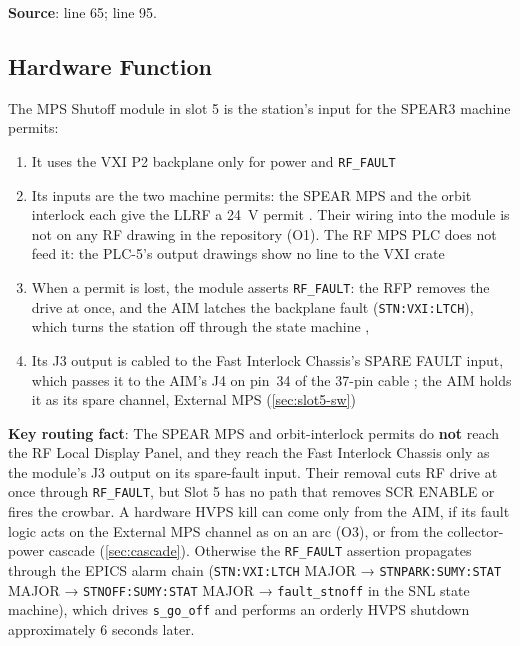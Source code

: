 \begin{keynote}
\textbf{Source}:  line 65;  line 95.
\end{keynote}

\subsection{Hardware Function}\label{sec:slot5-hw}


The MPS Shutoff module in slot 5 is the station's input for the SPEAR3 machine permits:

\begin{enumerate}
\def\labelenumi{\arabic{enumi}.}
\tightlist
\item
  It uses the VXI P2 backplane only for power and \texttt{RF\_FAULT} 
\item
  Its inputs are the two machine permits: the SPEAR MPS and the orbit interlock each give the LLRF a \qty{24}{\volt} permit . Their wiring into the module is not on any RF drawing in the repository (O1). The RF MPS PLC does not feed it: the PLC-5's output drawings show no line to the VXI crate 
\item
  When a permit is lost, the module asserts \texttt{RF\_FAULT}: the RFP removes the drive at once, and the AIM latches the backplane fault (\texttt{STN:\allowbreak{}VXI:\allowbreak{}LTCH}), which turns the station off through the state machine , 
\item
  Its J3 output is cabled to the Fast Interlock Chassis's SPARE FAULT input, which passes it to the AIM's J4 on pin~34 of the 37-pin cable ; the AIM holds it as its spare channel, External MPS (\cref{sec:slot5-sw})
\end{enumerate}

\begin{keynote}
\textbf{Key routing fact}: The SPEAR MPS and orbit-interlock permits do \textbf{not} reach the RF Local Display Panel, and they reach the Fast Interlock Chassis only as the module's J3 output on its spare-fault input. Their removal cuts RF drive at once through \texttt{RF\_FAULT}, but Slot 5 has no path that removes SCR ENABLE or fires the crowbar. A hardware HVPS kill can come only from the AIM, if its fault logic acts on the External MPS channel as on an arc (O3), or from the collector-power cascade (\cref{sec:cascade}). Otherwise the \texttt{RF\_FAULT} assertion propagates through the EPICS alarm chain (\texttt{STN:VXI:LTCH} MAJOR → \texttt{STNPARK:\allowbreak{}SUMY:\allowbreak{}STAT} MAJOR → \texttt{STNOFF:\allowbreak{}SUMY:\allowbreak{}STAT} MAJOR → \texttt{fault\_stnoff} in the SNL state machine), which drives \texttt{s\_go\_off} and performs an orderly HVPS shutdown approximately 6 seconds later.
\end{keynote}

